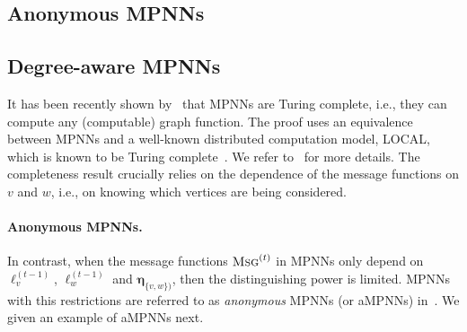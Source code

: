 \subsection{Anonymous MPNNs}\label{subsec:aMPNNs}



\subsection{Degree-aware MPNNs}\label{subsec:dMPNNs}


It has been recently shown by~\cite{Loukas2019} that MPNNs are Turing complete, i.e., they can compute any (computable) graph function. The proof uses an equivalence between MPNNs and a well-known distributed computation model, LOCAL, which is known to be Turing complete~\cite{Angluin}. We refer to~\cite{Loukas2019} for more details. The completeness result crucially relies on the dependence of the message functions on $v$ and $w$, i.e., on knowing which vertices are being considered. 

\paragraph{Anonymous MPNNs.} In contrast, when the message functions 
$\textsc{Msg}^{(t)}$ in MPNNs only depend on $\pmb{\ell}_v^{(t-1)}$, $\pmb{\ell}_w^{(t-1)}$ and $\pmb{\eta}_{\{v,w\})}$, then the distinguishing power is limited. MPNNs with this restrictions are referred to as \textit{anonymous} MPNNs (or aMPNNs) in~\cite{Loukas2019}. We given an example of aMPNNs next.


